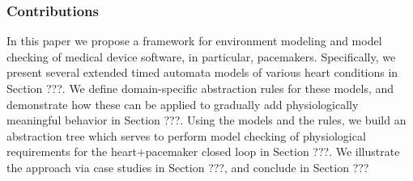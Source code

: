 \subsubsection{Contributions}
In this paper we propose a framework for environment modeling and model checking of medical device software, in particular, pacemakers.
Specifically, we present several extended timed automata models of various heart conditions in Section ???. 
We define domain-specific abstraction rules for these models, and demonstrate how these can be applied to gradually add physiologically meaningful behavior in Section ???. 
Using the models and the rules, we build an abstraction tree which serves to perform model checking of physiological requirements for the heart+pacemaker closed loop in Section ???.
We illustrate the approach via case studies in Section ???, and conclude in Section ???


